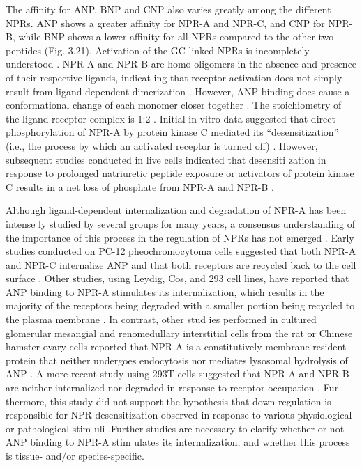 \documentclass[14pt,a4paper,onecolumn]{extarticle}
\begin{document}
The affinity for ANP, BNP and CNP also varies greatly among the different NPRs.  ANP shows a greater affinity for NPR-A and NPR-C, and CNP for NPR-B, while BNP shows a lower affinity for all NPRs compared to the other two peptides (Fig. 3.21).  Activation of the GC-linked NPRs is incompletely understood \citep{172}. NPR-A and NPR B are homo-oligomers in the absence and presence of their respective ligands, indicat ing that receptor activation does not simply result from ligand-dependent dimerization \citep{173}. However, ANP binding does cause a conformational change of each monomer closer together \citep{172} \citep{173} \citep{174} \citep{175} \citep{176}. The stoichiometry of the ligand-receptor complex is 1:2 \citep{177}.  Initial in vitro data suggested that direct phosphorylation of NPR-A by protein kinase C mediated its “desensitization” (i.e., the process by which an activated receptor is turned off) \citep{178}. However, subsequent studies conducted in live cells indicated that desensiti zation in response to prolonged natriuretic peptide exposure or activators of protein kinase C results in a net loss of phosphate from NPR-A and NPR-B \citep{171} \citep{179} \citep{180} \citep{181} \citep{182}.

Although ligand-dependent internalization and degradation of NPR-A has been intense ly studied by several groups for many years, a consensus understanding of the importance of this process in the regulation of NPRs has not emerged \citep{182}. Early studies conducted on PC-12 pheochromocytoma cells suggested that both NPR-A and NPR-C internalize ANP and that both receptors are recycled back to the cell surface \citep{184}. Other studies, using Leydig, Cos, and 293 cell lines, have reported that ANP binding to NPR-A stimulates its internalization, which results in the majority of the receptors being degraded with a smaller portion being recycled to the plasma membrane \citep{184} \citep{185} \citep{186} \citep{187}. In contrast, other stud ies performed in cultured glomerular mesangial and renomedullary interstitial cells from the rat or Chinese hamster ovary cells reported that NPR-A is a constitutively membrane resident protein that neither undergoes endocytosis nor mediates lysosomal hydrolysis of ANP \citep{188} \citep{189}. A more recent study using 293T cells suggested that NPR-A and NPR B are neither internalized nor degraded in response to receptor occupation \citep{173}. Fur thermore, this study did not support the hypothesis that down-regulation is responsible for NPR desensitization observed in response to various physiological or pathological stim uli \citep{182}.Further studies are necessary to clarify whether or not ANP binding to NPR-A stim ulates its internalization, and whether this process is tissue- and/or species-specific.
\end{document}
